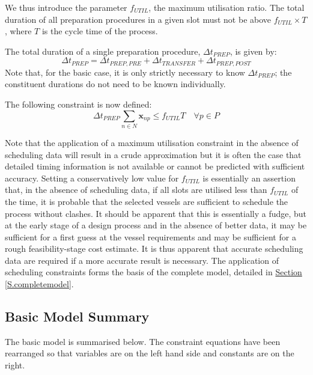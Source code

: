 We thus introduce the parameter $f_{\mathit{UTIL}}$, the maximum utilisation
ratio.
The total duration of all preparation procedures in a given slot must not be
above $f_{\mathit{UTIL}} \times T$, where $T$ is the cycle time of the
process.

The total duration of a single preparation procedure,
$\Delta t_{\mathit{PREP}}$, is given by:
\begin{equation}
    \Delta t_{\mathit{PREP}} = \Delta t_{\mathit{PREP,PRE}} + 
    \Delta t_{\mathit{TRANSFER}} + \Delta t_{\mathit{PREP,POST}}
\end{equation}
Note that, for the basic case, it is only strictly necessary to know
$\Delta t_{\mathit{PREP}}$; the constituent durations do not need to be
known individually.

The following constraint is now defined:
\begin{equation}
    \Delta t_{\mathit{PREP}} \sum_{n \in N} \boldsymbol{x}_{np} \le
    f_{\mathit{UTIL}} T \quad \forall p \in P
    \label{eq.constr4}
\end{equation}

Note that the application of a maximum utilisation constraint in the absence of
scheduling data will result in a crude approximation but it is often the case
that detailed timing information is not available or cannot be predicted with
sufficient accuracy.
Setting a conservatively low value for $f_{\mathit{UTIL}}$ is essentially an
assertion that, in the absence of scheduling data, if all slots are utilised
less than $f_{\mathit{UTIL}}$ of the time, it is probable that the selected
vessels are sufficient to schedule the process without clashes.
It should be apparent that this is essentially a fudge, but at the early stage
of a design process and in the absence of better data, it may be sufficient for
a first guess at the vessel requirements and may be sufficient for a rough
feasibility-stage cost estimate.
It is thus apparent that accurate scheduling data are required if a more
accurate result is necessary.  The application of scheduling constraints forms
the basis of the complete model, detailed in
\hyperref[S.completemodel]{Section \ref*{S.completemodel}}.

\subsection{Basic Model Summary}\label{SS.basicsummary}

The basic model is summarised below.
The constraint equations have been rearranged so that variables are on the left
hand side and constants are on the right.

